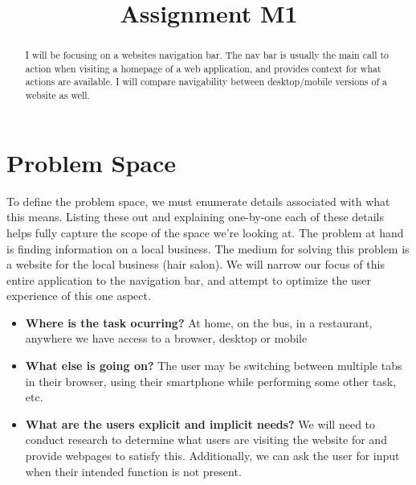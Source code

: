 

\title{Assignment M1\\}



\maketitle
\thispagestyle{fancy}

% 

\begin{abstract}
I will be focusing on a websites navigation bar. The nav bar is usually the main call to action when visiting a homepage of a web application, and provides context for what actions are available. I will compare navigability between desktop/mobile versions of a website as well.
\end{abstract}

\section{Problem Space}
To define the problem space, we must enumerate details associated with what this means. Listing these out and explaining one-by-one each of these details helps fully capture the scope of the space we're looking at. The problem at hand is finding information on a local business. The medium for solving this problem is a website for the local business (hair salon). We will narrow our focus of this entire application to the navigation bar, and attempt to optimize the user experience of this one aspect.

\begin{itemize}
\item
  \textbf{Where is the task ocurring?} At home, on the bus, in a restaurant, anywhere we have access to a browser, desktop or mobile
\item
  \textbf{What else is going on?} The user may be switching between multiple tabs in their browser, using their smartphone while performing some other task, etc.
\item
  \textbf{What are the users explicit and implicit needs?} We will need to conduct research to determine what users are visiting the website for and provide webpages to satisfy this. Additionally, we can ask the user for input when their intended function is not present.
\end{itemize}

